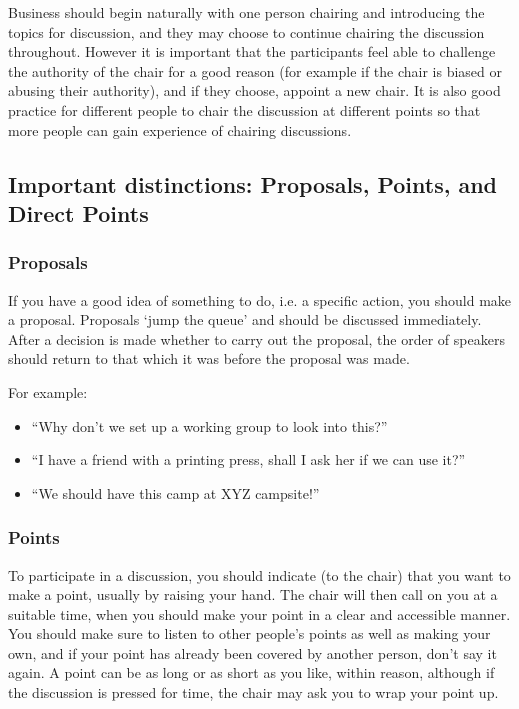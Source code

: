 \documentclass[a4paper, 11pt]{article} %
\begin{document}
Business should begin naturally with one person chairing and introducing the topics for discussion, and they may choose to continue chairing the discussion throughout.  However it is important that the participants feel able to challenge the authority of the chair for a good reason (for example if the chair is biased or abusing their authority), and if they choose, appoint a new chair.  It is also good practice for different people to chair the discussion at different points so that more people can gain experience of chairing discussions.

\subsection{Important distinctions: Proposals, Points, and Direct Points}
\subsubsection{Proposals}
If you have a good idea of something to do, i.e. a specific action, you should make a proposal.  Proposals `jump the queue' and should be discussed immediately.  After a decision is made whether to carry out the proposal, the order of speakers should return to that which it was before the proposal was made.

For example:
\begin{itemize}
\item ``Why don't we set up a working group to look into this?''
\item ``I have a friend with a printing press, shall I ask her if we can use it?''
\item ``We should have this camp at XYZ campsite!''
\end{itemize}

\subsubsection{Points}
To participate in a discussion, you should indicate (to the chair) that you want to make a point, usually by raising your hand.  The chair will then call on you at a suitable time, when you should make your point in a clear and accessible manner.  You should make sure to listen to other people's points as well as making your own, and if your point has already been covered by another person, don't say it again.  A point can be as long or as short as you like, within reason, although if the discussion is pressed for time, the chair may ask you to wrap your point up.
\end{document}
